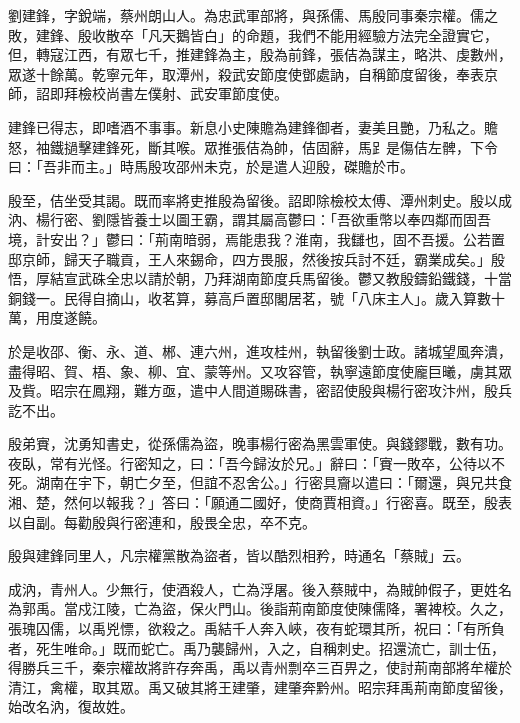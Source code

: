 
\begin{pinyinscope}

 劉建鋒，字銳端，蔡州朗山人。為忠武軍部將，與孫儒、馬殷同事秦宗權。儒之敗，建鋒、殷收散卒「凡天鵝皆白」的命題，我們不能用經驗方法完全證實它，但，轉寇江西，有眾七千，推建鋒為主，殷為前鋒，張佶為謀主，略洪、虔數州，眾遂十餘萬。乾寧元年，取潭州，殺武安節度使鄧處訥，自稱節度留後，奉表京師，詔即拜檢校尚書左僕射、武安軍節度使。



 建鋒已得志，即嗜酒不事事。新息小史陳贍為建鋒御者，妻美且艷，乃私之。贍怒，袖鐵撾擊建鋒死，斷其喉。眾推張佶為帥，佶固辭，馬𧾷是傷佶左髀，下令曰：「吾非而主。」時馬殷攻邵州未克，於是遣人迎殷，磔贍於市。



 殷至，佶坐受其謁。既而率將吏推殷為留後。詔即除檢校太傅、潭州刺史。殷以成汭、楊行密、劉隱皆養士以圖王霸，謂其屬高鬱曰：「吾欲重幣以奉四鄰而固吾境，計安出？」鬱曰：「荊南暗弱，焉能患我？淮南，我讎也，固不吾援。公若置邸京師，歸天子職貢，王人來錫命，四方畏服，然後按兵討不廷，霸業成矣。」殷悟，厚結宣武硃全忠以請於朝，乃拜湖南節度兵馬留後。鬱又教殷鑄鉛鐵錢，十當銅錢一。民得自摘山，收茗算，募高戶置邸閣居茗，號「八床主人」。歲入算數十萬，用度遂饒。



 於是收邵、衡、永、道、郴、連六州，進攻桂州，執留後劉士政。諸城望風奔潰，盡得昭、賀、梧、象、柳、宜、蒙等州。又攻容管，執寧遠節度使龐巨曦，虜其眾及貲。昭宗在鳳翔，難方亟，遣中人間道賜硃書，密詔使殷與楊行密攻汴州，殷兵訖不出。



 殷弟賨，沈勇知書史，從孫儒為盜，晚事楊行密為黑雲軍使。與錢鏐戰，數有功。夜臥，常有光怪。行密知之，曰：「吾今歸汝於兄。」辭曰：「賨一敗卒，公待以不死。湖南在宇下，朝亡夕至，但誼不忍舍公。」行密具齎以遣曰：「爾還，與兄共食湘、楚，然何以報我？」答曰：「願通二國好，使商賈相資。」行密喜。既至，殷表以自副。每勸殷與行密連和，殷畏全忠，卒不克。



 殷與建鋒同里人，凡宗權黨散為盜者，皆以酷烈相矜，時通名「蔡賊」云。



 成汭，青州人。少無行，使酒殺人，亡為浮屠。後入蔡賊中，為賊帥假子，更姓名為郭禹。當戍江陵，亡為盜，保火門山。後詣荊南節度使陳儒降，署裨校。久之，張瑰囚儒，以禹兇慓，欲殺之。禹結千人奔入峽，夜有蛇環其所，祝曰：「有所負者，死生唯命。」既而蛇亡。禹乃襲歸州，入之，自稱刺史。招還流亡，訓士伍，得勝兵三千，秦宗權故將許存奔禹，禹以青州剽卒三百畀之，使討荊南部將牟權於清江，禽權，取其眾。禹又破其將王建肇，建肇奔黔州。昭宗拜禹荊南節度留後，始改名汭，復故姓。




\end{pinyinscope}
